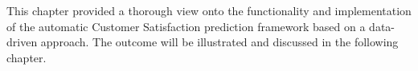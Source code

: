This chapter provided a thorough view onto the functionality and implementation of the automatic Customer Satisfaction prediction framework based on a data-driven approach. The outcome will be illustrated and discussed in the following chapter.







 



